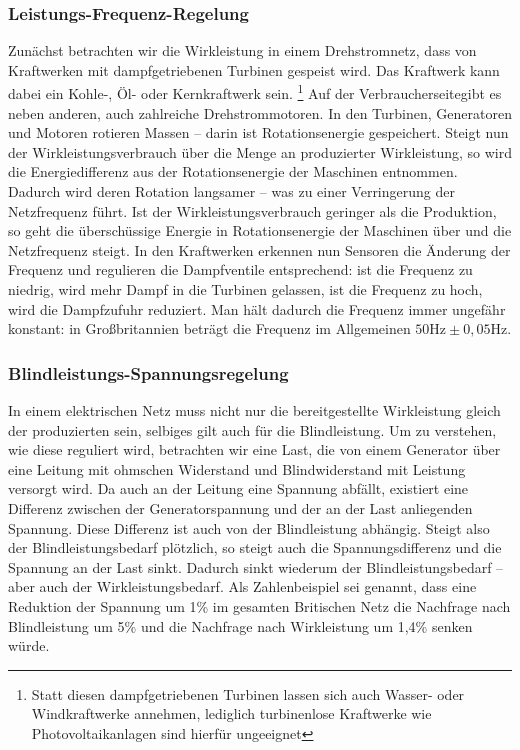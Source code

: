 \subsubsection{Leistungs-Frequenz-Regelung}
Zunächst betrachten wir die Wirkleistung in einem Drehstromnetz, dass von Kraftwerken mit dampfgetriebenen Turbinen gespeist wird. Das Kraftwerk kann dabei ein Kohle-, Öl- oder Kernkraftwerk sein. \footnote{Statt diesen dampfgetriebenen Turbinen lassen sich auch Wasser- oder Windkraftwerke annehmen, lediglich turbinenlose Kraftwerke wie Photovoltaikanlagen sind hierfür ungeeignet}
Auf der \q Verbraucherseite\qe gibt es neben anderen, auch zahlreiche Drehstrommotoren.
In den Turbinen, Generatoren und Motoren rotieren Massen – darin ist Rotationsenergie gespeichert.
Steigt nun der Wirkleistungsverbrauch über die Menge an produzierter Wirkleistung, so wird die Energiedifferenz aus der Rotationsenergie der Maschinen entnommen.\cite{Harrison}
Dadurch wird deren Rotation langsamer – was zu einer Verringerung der Netzfrequenz führt.
Ist der Wirkleistungsverbrauch geringer als die Produktion, so geht die überschüssige Energie in Rotationsenergie der Maschinen über und die Netzfrequenz steigt.
In den Kraftwerken erkennen nun Sensoren die Änderung der Frequenz und regulieren die Dampfventile entsprechend:
ist die Frequenz zu niedrig, wird mehr Dampf in die Turbinen gelassen, ist die Frequenz zu hoch, wird die Dampfzufuhr reduziert.
Man hält dadurch die Frequenz immer ungefähr konstant: in Großbritannien beträgt die Frequenz im Allgemeinen $50 \mathrm{Hz} \pm 0,05 \mathrm{Hz}$.\cite{Harrison} %

\subsubsection{Blindleistungs-Spannungsregelung}
In einem elektrischen Netz muss nicht nur die bereitgestellte Wirkleistung gleich der produzierten sein, selbiges gilt auch für die Blindleistung.
Um zu verstehen, wie diese reguliert wird, betrachten wir eine Last, die von einem Generator über eine Leitung mit ohmschen Widerstand und Blindwiderstand mit Leistung versorgt wird. Da auch an der Leitung eine Spannung abfällt, existiert eine Differenz zwischen der Generatorspannung und der an der Last anliegenden Spannung. Diese Differenz ist auch von der Blindleistung abhängig. Steigt also der Blindleistungsbedarf plötzlich, so steigt auch die Spannungsdifferenz und die Spannung an der Last sinkt. Dadurch sinkt wiederum der Blindleistungsbedarf – aber auch der Wirkleistungsbedarf.
Als Zahlenbeispiel sei genannt, dass eine Reduktion der Spannung um 1\% im gesamten Britischen Netz die Nachfrage nach Blindleistung um 5\% und die Nachfrage nach Wirkleistung um 1,4\% senken würde.

